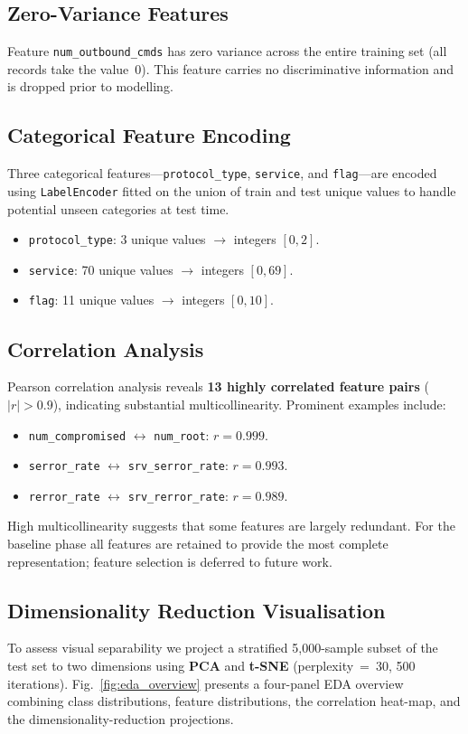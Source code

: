 \documentclass[conference]{IEEEtran}
\begin{document}
\subsection{Zero-Variance Features}
Feature \texttt{num\_outbound\_cmds} has zero variance across the entire training set
(all records take the value~0).  This feature carries no discriminative information
and is dropped prior to modelling.

\subsection{Categorical Feature Encoding}
Three categorical features---\texttt{protocol\_type}, \texttt{service}, and
\texttt{flag}---are encoded using \texttt{LabelEncoder} fitted on the union of train
and test unique values to handle potential unseen categories at test time.
\begin{itemize}
  \item \texttt{protocol\_type}: 3 unique values $\rightarrow$ integers $[0,2]$.
  \item \texttt{service}: 70 unique values $\rightarrow$ integers $[0,69]$.
  \item \texttt{flag}: 11 unique values $\rightarrow$ integers $[0,10]$.
\end{itemize}

\subsection{Correlation Analysis}
\label{ssec:corr}
Pearson correlation analysis reveals \textbf{13 highly correlated feature pairs}
($|r|>0.9$), indicating substantial multicollinearity.  Prominent examples include:

\begin{itemize}
  \item \texttt{num\_compromised} $\leftrightarrow$ \texttt{num\_root}: $r=0.999$.
  \item \texttt{serror\_rate} $\leftrightarrow$ \texttt{srv\_serror\_rate}: $r=0.993$.
  \item \texttt{rerror\_rate} $\leftrightarrow$ \texttt{srv\_rerror\_rate}: $r=0.989$.
\end{itemize}

High multicollinearity suggests that some features are largely redundant.  For the
baseline phase all features are retained to provide the most complete representation;
feature selection is deferred to future work.

\subsection{Dimensionality Reduction Visualisation}
\label{ssec:dimred}
To assess visual separability we project a stratified 5,000-sample subset of the
test set to two dimensions using \textbf{PCA} and \textbf{t-SNE} (perplexity~=~30,
500 iterations).  Fig.~\ref{fig:eda_overview} presents a four-panel EDA overview
combining class distributions, feature distributions, the correlation heat-map, and
the dimensionality-reduction projections.
\end{document}
